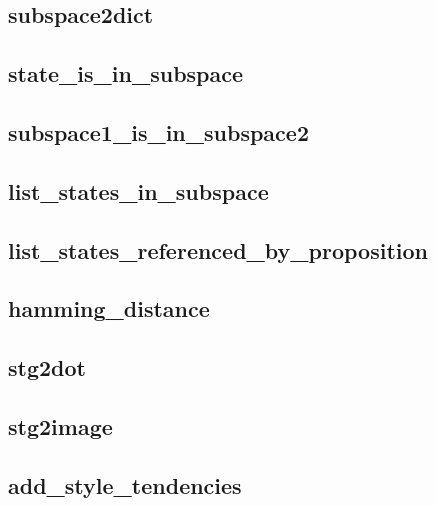 \documentclass[letterpaper,10pt,english]{sphinxmanual}
\begin{document}
\subsection{subspace2dict}
\label{StateTransitionGraphs:id11}\label{StateTransitionGraphs:subspace2dict}

\subsection{state\_is\_in\_subspace}
\label{StateTransitionGraphs:id12}\label{StateTransitionGraphs:state-is-in-subspace}

\subsection{subspace1\_is\_in\_subspace2}
\label{StateTransitionGraphs:subspace1-is-in-subspace2}\label{StateTransitionGraphs:id13}

\subsection{list\_states\_in\_subspace}
\label{StateTransitionGraphs:id14}\label{StateTransitionGraphs:list-states-in-subspace}

\subsection{list\_states\_referenced\_by\_proposition}
\label{StateTransitionGraphs:list-states-referenced-by-proposition}\label{StateTransitionGraphs:id15}

\subsection{hamming\_distance}
\label{StateTransitionGraphs:hamming-distance}\label{StateTransitionGraphs:id16}

\subsection{stg2dot}
\label{StateTransitionGraphs:stg2dot}\label{StateTransitionGraphs:id17}

\subsection{stg2image}
\label{StateTransitionGraphs:stg2image}\label{StateTransitionGraphs:id18}

\subsection{add\_style\_tendencies}
\label{StateTransitionGraphs:id19}\label{StateTransitionGraphs:add-style-tendencies}
\end{document}
